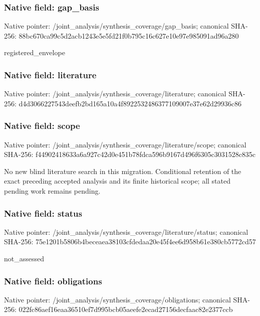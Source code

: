 \documentclass[10pt,a4paper]{article}
\begin{document}
\subsubsection{Native field: gap\_\allowbreak{}basis}
Native pointer: /joint\_\allowbreak{}analysis/synthesis\_\allowbreak{}coverage/gap\_\allowbreak{}basis; canonical SHA-256: 88bc670ca99c5d2acb1243e5e5fd21f0b795c16c627e10e97e985091ad96a280

\begingroup\raggedright\sloppy registered\_\allowbreak{}envelope\par\endgroup

\subsubsection{Native field: literature}
Native pointer: /joint\_\allowbreak{}analysis/synthesis\_\allowbreak{}coverage/literature; canonical SHA-256: d4d3066227543deefb2bd165a10a4f8922532486377109007e37e62d29936c86

\subsubsection{Native field: scope}
Native pointer: /joint\_\allowbreak{}analysis/synthesis\_\allowbreak{}coverage/literature/scope; canonical SHA-256: f44902418633a6a927c42d0e451b78fdca596b9167d496f6305c3031528c835c

\begingroup\raggedright\sloppy No new blind literature search in this migration. Conditional retention of the exact preceding accepted analysis and its finite historical scope;\allowbreak{} all stated pending work remains pending.\par\endgroup

\subsubsection{Native field: status}
Native pointer: /joint\_\allowbreak{}analysis/synthesis\_\allowbreak{}coverage/literature/status; canonical SHA-256: 75e1201b5806b4beceaea38103cfdedaa20e45f4ee6d958b61e380cb5772cd57

\begingroup\raggedright\sloppy not\_\allowbreak{}assessed\par\endgroup

\subsubsection{Native field: obligations}
Native pointer: /joint\_\allowbreak{}analysis/synthesis\_\allowbreak{}coverage/obligations; canonical SHA-256: 022fc86aef16eaa36510ef7d995bcb05aeefe2ecad27156decfaac82e2377ccb
\end{document}

